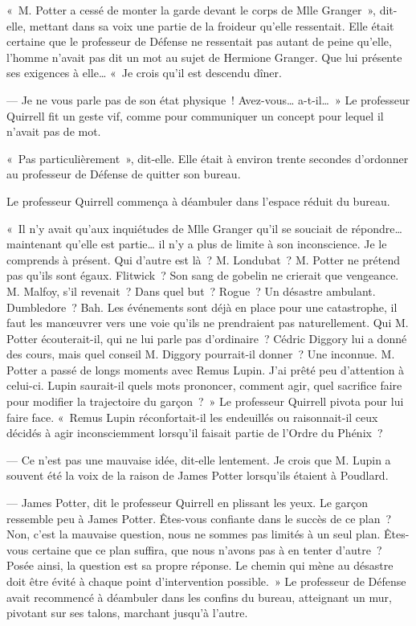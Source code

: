 «~M. Potter a cessé de monter la garde devant le corps de Mlle Granger~», dit-elle, mettant dans sa voix une partie de la froideur qu'elle ressentait.
Elle était certaine que le professeur de Défense ne ressentait pas autant de peine qu'elle, l'homme n'avait pas dit un mot au sujet de Hermione Granger.
Que lui présente ses exigences à elle…
«~Je crois qu'il est descendu dîner.

--- Je ne vous parle pas de son état physique~!
Avez-vous… a-t-il…~»
Le professeur Quirrell fit un geste vif, comme pour communiquer un concept pour lequel il n'avait pas de mot.

«~Pas particulièrement~», dit-elle.
Elle était à environ trente secondes d'ordonner au professeur de Défense de quitter son bureau.

Le professeur Quirrell commença à déambuler dans l'espace réduit du bureau.

«~Il n'y avait qu'aux inquiétudes de Mlle Granger qu'il se souciait de répondre… maintenant qu'elle est partie… il n'y a plus de limite à son inconscience.
Je le comprends à présent.
Qui d'autre est là~?
M. Londubat~?
M. Potter ne prétend pas qu'ils sont égaux.
Flitwick~?
Son sang de gobelin ne crierait que vengeance.
M. Malfoy, s'il revenait~?
Dans quel but~?
Rogue~? Un désastre ambulant.
Dumbledore~?
Bah. Les événements sont déjà en place pour une catastrophe, il faut les manœuvrer vers une voie qu'ils ne prendraient pas naturellement.
Qui M. Potter écouterait-il, qui ne lui parle pas d'ordinaire~?
Cédric Diggory lui a donné des cours, mais quel conseil M. Diggory pourrait-il donner~?
Une inconnue.
M. Potter a passé de longs moments avec Remus Lupin.
J'ai prêté peu d'attention à celui-ci.
Lupin saurait-il quels mots prononcer, comment agir, quel sacrifice faire pour modifier la trajectoire du garçon~?~»
Le professeur Quirrell pivota pour lui faire face.
«~Remus Lupin réconfortait-il les endeuillés ou raisonnait-il ceux décidés à agir inconsciemment lorsqu'il faisait partie de l'Ordre du Phénix~?

--- Ce n'est pas une mauvaise idée, dit-elle lentement.
Je crois que M. Lupin a souvent été la voix de la raison de James Potter lorsqu'ils étaient à Poudlard.

--- James Potter, dit le professeur Quirrell en plissant les yeux.
Le garçon ressemble peu à James Potter.
Êtes-vous confiante dans le succès de ce plan~?
Non, c'est la mauvaise question, nous ne sommes pas limités à un seul plan.
Êtes-vous certaine que ce plan suffira, que nous n'avons pas à en tenter d'autre~?
Posée ainsi, la question est sa propre réponse.
Le chemin qui mène au désastre doit être évité à chaque point d'intervention possible.~»
Le professeur de Défense avait recommencé à déambuler dans les confins du bureau, atteignant un mur, pivotant sur ses talons, marchant jusqu'à l'autre.

